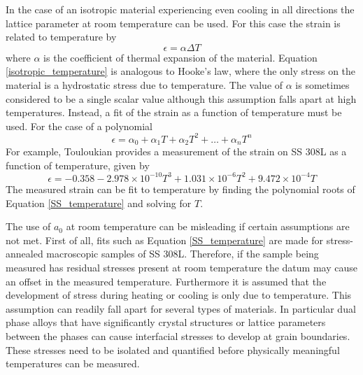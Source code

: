 In the case of an isotropic material experiencing even cooling in all directions the lattice parameter at room temperature can be used. For this case the strain is related to temperature by
\begin{equation}
	\epsilon = \alpha \Delta T
	\label{isotropic_temperature}
\end{equation}
where $\alpha$ is the coefficient of thermal expansion of the material. Equation \ref{isotropic_temperature} is analogous to Hooke's law, where the only stress on the material is a hydrostatic stress due to temperature. The value of $\alpha$ is sometimes considered to be a single scalar value although this assumption falls apart at high temperatures. Instead, a fit of the strain as a function of temperature must be used. For the case of a polynomial
\begin{equation}
	\epsilon = \alpha_0 + \alpha_1 T + \alpha_2 T^2 + \ldots + \alpha_n T^n
	\label{polynomial_temperature}
\end{equation}
For example, Touloukian \cite{Touloukian1975} provides a measurement of the strain on SS 308L as a function of temperature, given by
\begin{equation}	
	\epsilon = -0.358 -2.978\times10^{-10}T^3 + 1.031\times10^{-6}T^2 +  9.472\times10^{-4} T 
	\label{SS_temperature}
\end{equation}
The measured strain can be fit to temperature by finding the polynomial roots of Equation \ref{SS_temperature} and solving for $T$. 

The use of $a_0$ at room temperature can be misleading if certain assumptions are not met. First of all, fits such as Equation \ref{SS_temperature} are made for stress-annealed macroscopic samples of SS 308L. Therefore, if the sample being measured has residual stresses present at room temperature the datum may cause an offset in the measured temperature. Furthermore it is assumed that the development of stress during heating or cooling is only due to temperature. This assumption can readily fall apart for several types of materials. In particular dual phase alloys that have significantly crystal structures or lattice parameters between the phases can cause interfacial stresses to develop at grain boundaries. These stresses need to be isolated and quantified before physically meaningful temperatures can be measured. 

